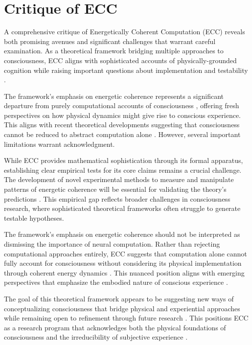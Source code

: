 \section{Critique of ECC}

A comprehensive critique of Energetically Coherent Computation (ECC) reveals both promising avenues and significant challenges that warrant careful examination. As a theoretical framework bridging multiple approaches to consciousness, ECC aligns with sophisticated accounts of physically-grounded cognition while raising important questions about implementation and testability \cite{thompson2014waking, varela2016embodied}.

The framework's emphasis on energetic coherence represents a significant departure from purely computational accounts of consciousness \cite{koch2019feeling}, offering fresh perspectives on how physical dynamics might give rise to conscious experience. This aligns with recent theoretical developments suggesting that consciousness cannot be reduced to abstract computation alone \cite{dennett2017bacteria}. However, several important limitations warrant acknowledgment.

While ECC provides mathematical sophistication through its formal apparatus, establishing clear empirical tests for its core claims remains a crucial challenge. The development of novel experimental methods to measure and manipulate patterns of energetic coherence will be essential for validating the theory's predictions \cite{seth2021being}. This empirical gap reflects broader challenges in consciousness research, where sophisticated theoretical frameworks often struggle to generate testable hypotheses.

The framework's emphasis on energetic coherence should not be interpreted as dismissing the importance of neural computation. Rather than rejecting computational approaches entirely, ECC suggests that computation alone cannot fully account for consciousness without considering its physical implementation through coherent energy dynamics \cite{goff2019galileo}. This nuanced position aligns with emerging perspectives that emphasize the embodied nature of conscious experience \cite{noe2009out}.

The goal of this theoretical framework appears to be suggesting new ways of conceptualizing consciousness that bridge physical and experiential approaches while remaining open to refinement through future research \cite{chalmers2010character}. This positions ECC as a research program that acknowledges both the physical foundations of consciousness and the irreducibility of subjective experience \cite{churchland2013touching}.

